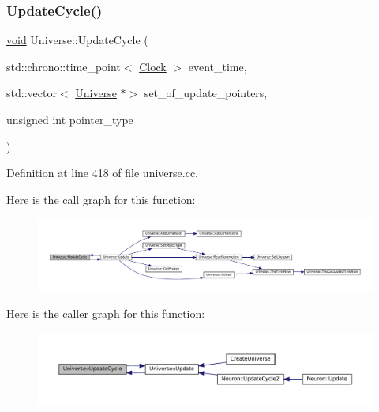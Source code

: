 \subsubsection{\texorpdfstring{Update\+Cycle()}{UpdateCycle()}}
{\footnotesize\ttfamily \mbox{\hyperlink{glad_8h_a950fc91edb4504f62f1c577bf4727c29}{void}} Universe\+::\+Update\+Cycle (\begin{DoxyParamCaption}\item[{std\+::chrono\+::time\+\_\+point$<$ \mbox{\hyperlink{universe_8h_a0ef8d951d1ca5ab3cfaf7ab4c7a6fd80}{Clock}} $>$}]{event\+\_\+time,  }\item[{std\+::vector$<$ \mbox{\hyperlink{class_universe}{Universe}} $\ast$$>$}]{set\+\_\+of\+\_\+update\+\_\+pointers,  }\item[{unsigned int}]{pointer\+\_\+type }\end{DoxyParamCaption})}



Definition at line 418 of file universe.\+cc.

Here is the call graph for this function\+:\nopagebreak
\begin{figure}[H]
\begin{center}
\leavevmode
\includegraphics[width=350pt]{class_universe_a0d79e614e1af951c06b78cb5768f9c8e_cgraph}
\end{center}
\end{figure}
Here is the caller graph for this function\+:\nopagebreak
\begin{figure}[H]
\begin{center}
\leavevmode
\includegraphics[width=350pt]{class_universe_a0d79e614e1af951c06b78cb5768f9c8e_icgraph}
\end{center}
\end{figure}
\mbox{\label{class_universe_a63e878aaf03f1800b255e9a089a72a8b}} 
